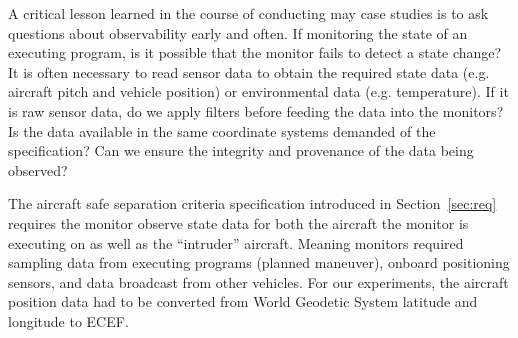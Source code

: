 A critical lesson learned in the course of conducting may case studies
is to ask questions about observability early and often. 
If monitoring the state of an executing program, is it possible that
the monitor fails to detect a state change?  It is often necessary to
read sensor data to obtain the required state data (e.g. aircraft
pitch and vehicle position) or environmental data (e.g. temperature).
If it is raw sensor data, do we apply filters before feeding the data
into the monitors?  Is the data available in the same coordinate
systems demanded of the specification?  Can we ensure the integrity
and provenance of the data being observed? 


  The aircraft safe separation criteria specification introduced in
  Section~\ref{sec:req} requires the monitor observe state data for
  both the aircraft the monitor is executing on as well as the
  ``intruder'' aircraft.  Meaning monitors required sampling data from
  executing programs (planned maneuver), onboard positioning sensors,
  and data broadcast from other vehicles.  For our experiments, the
  aircraft position data had to be converted from World Geodetic
  System latitude and longitude to ECEF.


